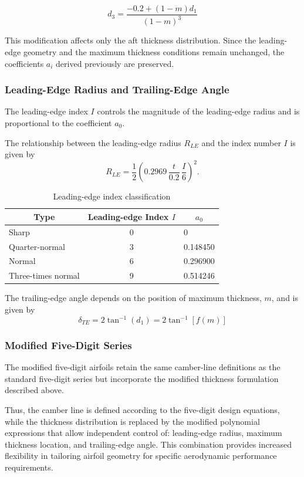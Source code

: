 \[
d_3=\frac{-0.2+(1-m)d_1}{(1-m)^3}
\]

This modification affects only the aft thickness distribution.
Since the leading-edge geometry and the maximum thickness conditions
remain unchanged, the coefficients $a_i$ derived previously are preserved.


\subsubsection*{Leading-Edge Radius and Trailing-Edge Angle}

The leading-edge index $I$ controls the magnitude of the leading-edge 
radius and is proportional to the coefficient $a_0$.

The relationship between the leading-edge radius $R_{LE}$ and 
the index number $I$ is given by
\[
R_{LE}
=
\frac{1}{2}
\left(
0.2969\,
\frac{t}{0.2}\,
\frac{I}{6}
\right)^2.
\]

\begin{table}[h!]
\centering
\label{tab:le_index}
\begin{tabular}{|l|c|l|}
\hline
\multicolumn{1}{c|}{Type} & Leading-edge Index $I$ & \multicolumn{1}{c|}{$a_0$}\\
\hline
Sharp & 0 & 0 \\
Quarter-normal & 3 & 0.148450 \\
Normal & 6 & 0.296900 \\
Three-times normal & 9 & 0.514246 \\
\hline
\end{tabular}
\caption{Leading-edge index classification}
\end{table}

The trailing-edge angle depends on the position of maximum thickness, $m$, and is given by
\[
\delta_{TE} =2\tan^{-1}{(d_1)} = 2\tan^{-1}{[f(m)]}
\]


\subsubsection*{Modified Five-Digit Series}

The modified five-digit airfoils retain the same camber-line 
definitions as the standard five-digit series but incorporate 
the modified thickness formulation described above.

Thus, 
the camber line is defined according to the five-digit 
design equations, while the thickness distribution is replaced 
by the modified polynomial expressions that allow independent 
control of: leading-edge radius, maximum thickness location, and trailing-edge angle. 
This combination provides increased flexibility in tailoring airfoil geometry for specific aerodynamic performance requirements.


